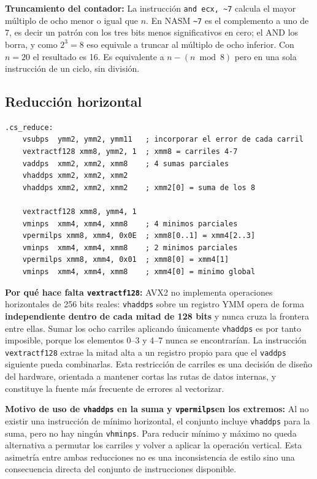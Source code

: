 \documentclass[journal]{IEEEtran}
\begin{document}
\textbf{Truncamiento del contador:} La instrucción \texttt{and ecx, \~{}7}
calcula el mayor múltiplo de ocho menor o igual que $n$. En NASM
\texttt{\~{}7} es el complemento a uno de 7, es decir un patrón con los
tres bits menos significativos en cero; el AND los borra, y como
$2^3 = 8$ eso equivale a truncar al múltiplo de ocho inferior. Con
$n = 20$ el resultado es 16. Es equivalente a $n - (n \bmod 8)$ pero en
una sola instrucción de un ciclo, sin división.

\subsection{Reducción horizontal}

\begin{lstlisting}[caption={Reducción horizontal de los ocho carriles a
  un escalar.}, label={lst:reduccion}]
.cs_reduce:
    vsubps  ymm2, ymm2, ymm11   ; incorporar el error de cada carril
    vextractf128 xmm8, ymm2, 1  ; xmm8 = carriles 4-7
    vaddps  xmm2, xmm2, xmm8    ; 4 sumas parciales
    vhaddps xmm2, xmm2, xmm2
    vhaddps xmm2, xmm2, xmm2    ; xmm2[0] = suma de los 8

    vextractf128 xmm8, ymm4, 1
    vminps  xmm4, xmm4, xmm8    ; 4 minimos parciales
    vpermilps xmm8, xmm4, 0x0E  ; xmm8[0..1] = xmm4[2..3]
    vminps  xmm4, xmm4, xmm8    ; 2 minimos parciales
    vpermilps xmm8, xmm4, 0x01  ; xmm8[0] = xmm4[1]
    vminps  xmm4, xmm4, xmm8    ; xmm4[0] = minimo global
\end{lstlisting}

\textbf{Por qué hace falta \texttt{vextractf128}:} AVX2 no implementa
operaciones horizontales de 256 bits reales: \texttt{vhaddps} sobre un
registro YMM opera de forma \textbf{independiente dentro de cada mitad de
128 bits} y nunca cruza la frontera entre ellas. Sumar los ocho carriles
aplicando únicamente \texttt{vhaddps} es por tanto imposible, porque los
elementos 0--3 y 4--7 nunca se encontrarían. La instrucción
\texttt{vextractf128} extrae la mitad alta a un registro propio para que
el \texttt{vaddps} siguiente pueda combinarlas. Esta restricción de
carriles es una decisión de diseño del hardware, orientada a mantener
cortas las rutas de datos internas, y constituye la fuente más frecuente
de errores al vectorizar.

\textbf{Motivo de uso de \texttt{vhaddps} en la suma y 
\texttt{vpermilps}en los extremos:} Al no existir una instrucción de
mínimo horizontal, el conjunto incluye \texttt{vhaddps} para la suma,
pero no hay ningún \texttt{vhminps}. Para reducir mínimo y máximo no
queda alternativa a permutar los carriles y volver a aplicar la operación
vertical. Esta asimetría entre ambas reducciones no es una inconsistencia
de estilo sino una consecuencia directa del conjunto de instrucciones
disponible.
\end{document}
